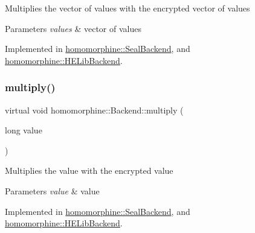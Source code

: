 Multiplies the vector of values with the encrypted vector of values


\begin{DoxyParams}{Parameters}
{\em values} & vector of values \\
\hline
\end{DoxyParams}


Implemented in \mbox{\hyperlink{classhomomorphine_1_1_seal_backend_ace0bb8cd6a0e4b22f6e3e7ab00ea1197}{homomorphine\+::\+Seal\+Backend}}, and \mbox{\hyperlink{classhomomorphine_1_1_h_e_lib_backend_a05b508bcc4a165d045ebc09f190c5a95}{homomorphine\+::\+H\+E\+Lib\+Backend}}.

\mbox{\label{classhomomorphine_1_1_backend_a8b09933415165eb84234d9ccfbf2c3c4}} 
\subsubsection{\texorpdfstring{multiply()}{multiply()}\hspace{0.1cm}{\footnotesize\ttfamily [2/2]}}
{\footnotesize\ttfamily virtual void homomorphine\+::\+Backend\+::multiply (\begin{DoxyParamCaption}\item[{long}]{value }\end{DoxyParamCaption})\hspace{0.3cm}{\ttfamily [pure virtual]}}

Multiplies the value with the encrypted value


\begin{DoxyParams}{Parameters}
{\em value} & value \\
\hline
\end{DoxyParams}


Implemented in \mbox{\hyperlink{classhomomorphine_1_1_seal_backend_afd8f13068d81c0038b966df4219e8033}{homomorphine\+::\+Seal\+Backend}}, and \mbox{\hyperlink{classhomomorphine_1_1_h_e_lib_backend_a49d4e073eecc4759f12f60188a533835}{homomorphine\+::\+H\+E\+Lib\+Backend}}.

\mbox{\label{classhomomorphine_1_1_backend_ab0064461260713ce7a9f660b5f6dc5af}} 
